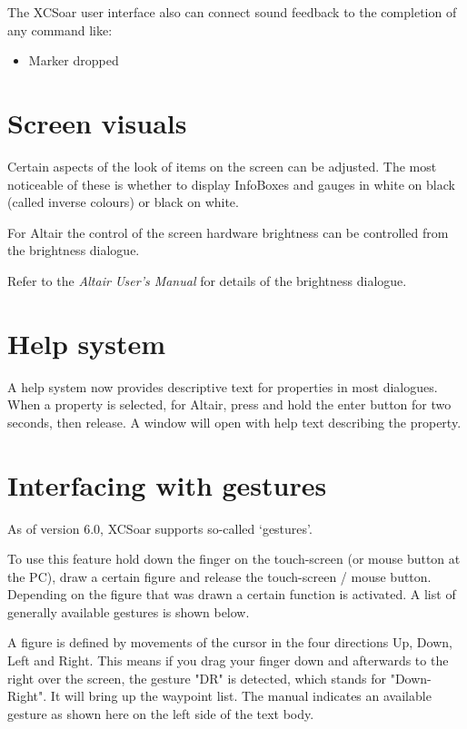 The XCSoar user interface also can connect sound feedback to the completion 
of any command like:
\begin{itemize}
\item Marker dropped
\end{itemize}


\section{Screen visuals}

Certain aspects of the look of items on the screen can be adjusted.
The most noticeable of these is whether to display InfoBoxes and
gauges in white on black (called inverse colours) or black on white.

For Altair the control of the screen hardware 
brightness can be controlled from the brightness dialogue.
\begin{quote}
\blink{}
\end{quote}

Refer to the {\em Altair User's Manual} for details of the brightness
dialogue.


\section{Help system}

A help system now provides descriptive text for properties in
most dialogues.  When a property is selected, for Altair, press and hold the
enter button for two seconds, then release.  A window will open with
help text describing the property.

\section{Interfacing with gestures}\label{sec:gestures}
As of version 6.0, XCSoar supports so-called `gestures'.

To use this feature hold down the finger on the 
touch-screen (or mouse button at the PC), draw a certain figure and release 
the touch-screen / mouse button. Depending on the figure that was drawn 
a certain function is activated. A list of generally available gestures is 
shown below. 

A figure is defined by movements of the 
cursor in the four directions Up, Down, Left and Right. This means if 
you drag your finger down and afterwards to the right over the screen, 
 the gesture "DR" is detected, which stands for "Down-Right". 
It will bring up the waypoint list. The manual indicates an available 
gesture as shown here on the left side of the text body.

